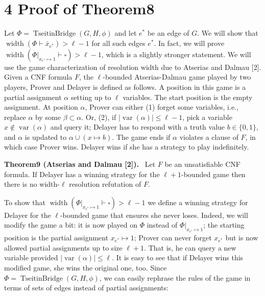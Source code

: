 \documentclass[10pt,a4paper]{article}
\newenvironment{authorclaim}[1]{\par\medskip\noindent\textbf{#1.}\ \ignorespaces}{\par\medskip}
\begin{document}
\section*{4 Proof of Theorem8}
Let $\Phi=\operatorname{TseitinBridge}(G,H,\phi)$ and let $e^*$ be an edge of $G$. We will show that $\operatorname{width}(\Phi\vdash\bar x_{e^*})>\ell-1$ for all such edges $e^*$. In fact, we will prove $\operatorname{width}(\Phi|_{x_{e^*}\mapsto1}\vdash\square)>\ell-1$, which is a slightly stronger statement.
We will use the game characterization of resolution width due to Atserias and Dalmau [2]. Given a CNF formula $F$, the $\ell$-bounded Atserias-Dalmau game played by two players, Prover and Delayer is defined as follows. A position in this game is a partial assignment $\alpha$ setting up to $\ell$ variables. The start position is the empty assignment. At position $\alpha$, Prover can either (1) forget some variables, i.e., replace $\alpha$ by some $\beta\subset\alpha$. Or, (2), if $|\operatorname{var}(\alpha)|\le\ell-1$, pick a variable $x\notin\operatorname{var}(\alpha)$ and query it; Delayer has to respond with a truth value $b\in\{0,1\}$, and $\alpha$ is updated to $\alpha\cup(x\mapsto b)$. The game ends if $\alpha$ violates a clause of $F$, in which case Prover wins. Delayer wins if she has a strategy to play indefinitely.
\begin{authorclaim}{Theorem9 (Atserias and Dalmau [2])}
Let $F$ be an unsatisfiable CNF formula. If Delayer has a winning strategy for the $\ell+1$-bounded game then there is no width-$\ell$ resolution refutation of $F$.
\end{authorclaim}
To show that $\operatorname{width}(\Phi|_{x_{e^*}\mapsto1}\vdash\square)>\ell-1$ we define a winning strategy for Delayer for the $\ell$-bounded game that ensures she never loses. Indeed, we will modify the game a bit: it is now played on $\Phi$ instead of $\Phi|_{x_{e^*}\mapsto1}$; the starting position is the partial assignment $x_{e^*}\mapsto1$; Prover can never forget $x_{e^*}$ but is now allowed partial assignments up to size $\ell+1$. That is, he can query a new variable provided $|\operatorname{var}(\alpha)|\le\ell$. It is easy to see that if Delayer wins this modified game, she wins the original one, too. Since $\Phi=\operatorname{TseitinBridge}(G,H,\phi)$, we can easily rephrase the rules of the game in terms of sets of edges instead of partial assignments:
\end{document}
